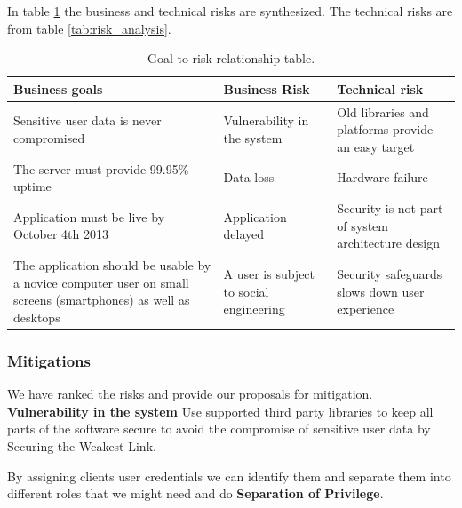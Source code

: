 \documentclass[a4paper]{article}
\begin{document}
In table \ref{tab:goal_to_risk_relationship} the business and technical risks are synthesized. The technical risks are from table \ref{tab:risk_analysis}.

\begin{table}[h!]
	\begin{tabular}{| p{4cm} | p{4cm}| p{4cm} |}
    \hline
   	\textbf{Business goals} & \textbf{Business Risk} & \textbf{Technical risk} \\ \hline
   Sensitive user data is never compromised & Vulnerability in the system & Old libraries and platforms provide an easy target \\ \hline
    The server must provide 99.95\% uptime & Data loss &  Hardware failure \\ \hline
    Application must be live by October 4th 2013 & Application delayed &  Security is not part of system architecture design \\ \hline
    The application should be usable by a novice computer user on small screens (smartphones) as well as desktops & A user is subject to social engineering & Security safeguards slows down user experience \\ \hline
    \end{tabular}
    \caption{Goal-to-risk relationship table.}
	\label{tab:goal_to_risk_relationship}
\end{table}



\subsubsection{Mitigations}
We have ranked the risks and provide our proposals for mitigation.
\textbf{Vulnerability in the system}
Use supported third party libraries to keep all parts of the software secure to avoid the compromise of sensitive user data by Securing the Weakest Link.


By assigning clients user credentials we can identify them and separate them into different roles that we might need and do \textbf{Separation of Privilege}.
\end{document}
